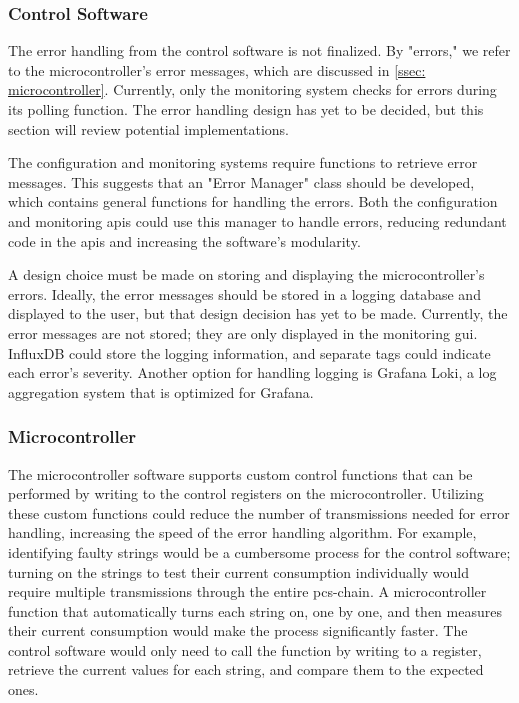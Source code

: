 \documentclass[main.tex]{subfiles}
\begin{document}
\subsubsection{Control Software}

The error handling from the control software is not finalized. By "errors," we refer to the microcontroller's error messages, which are discussed in \autoref{ssec: microcontroller}. Currently, only the monitoring system checks for errors during its polling function. The error handling design has yet to be decided, but this section will review potential implementations.

The configuration and monitoring systems require functions to retrieve error messages. This suggests that an "Error Manager" class should be developed, which contains general functions for handling the errors. Both the configuration and monitoring \gls{api}s could use this manager to handle errors, reducing redundant code in the \gls{api}s and increasing the software's modularity.

A design choice must be made on storing and displaying the microcontroller's errors. Ideally, the error messages should be stored in a logging database and displayed to the user, but that design decision has yet to be made. Currently, the error messages are not stored; they are only displayed in the monitoring \gls{gui}. InfluxDB could store the logging information, and separate tags could indicate each error's severity. Another option for handling logging is Grafana Loki, a log aggregation system that is optimized for Grafana. 

\subsubsection{Microcontroller}
The microcontroller software supports custom control functions that can be performed by writing to the control registers on the microcontroller. Utilizing these custom functions could reduce the number of transmissions needed for error handling, increasing the speed of the error handling algorithm. For example, identifying faulty strings would be a cumbersome process for the control software; turning on the strings to test their current consumption individually would require multiple transmissions through the entire \gls{pcs}-chain. A microcontroller function that automatically turns each string on, one by one, and then measures their current consumption would make the process significantly faster. The control software would only need to call the function by writing to a register, retrieve the current values for each string, and compare them to the expected ones.
\end{document}
